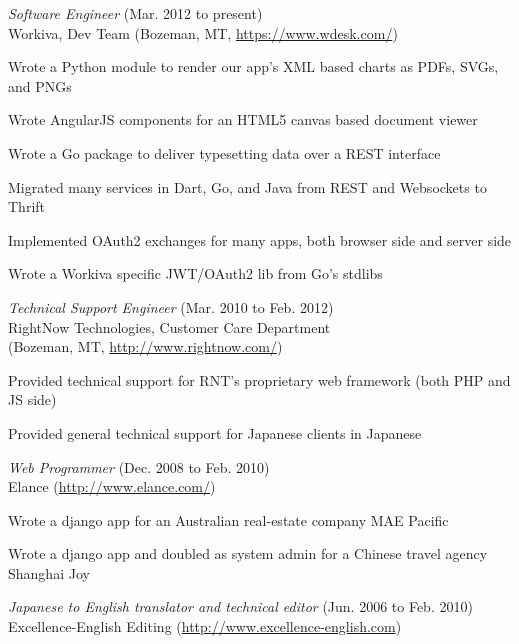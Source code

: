 \documentclass[10pt, a4paper]{article}
\begin{document}
\begin{itemize*}
  \item \emph{Software Engineer} (Mar. 2012 to present)\\
    Workiva, Dev Team (Bozeman, MT, \url{https://www.wdesk.com/})
    \begin{itemize*}
      \item Wrote a Python module to render our app's XML based charts as PDFs, SVGs, and PNGs
      \item Wrote AngularJS components for an HTML5 canvas based document viewer
      \item Wrote a Go package to deliver typesetting data over a REST interface
      \item Migrated many services in Dart, Go, and Java from REST and Websockets to Thrift
      \item Implemented OAuth2 exchanges for many apps, both browser side and server side
      \item Wrote a Workiva specific JWT/OAuth2 lib from Go's stdlibs
    \end{itemize*}
  \item \emph{Technical Support Engineer} (Mar. 2010 to Feb. 2012)\\
    RightNow Technologies, Customer Care Department\\
    (Bozeman, MT, \url{http://www.rightnow.com/})
    \begin{itemize*}
      \item Provided technical support for RNT's proprietary web framework (both PHP and JS side)
      \item Provided general technical support for Japanese clients in Japanese
    \end{itemize*}
  \item \emph{Web Programmer} (Dec. 2008 to Feb. 2010)\\
    Elance (\url{http://www.elance.com/})
    \begin{itemize*}
      \item Wrote a django app for an Australian real-estate company MAE Pacific
      \item Wrote a django app and doubled as system admin for a Chinese travel agency Shanghai Joy
    \end{itemize*}
  \item \emph{Japanese to English translator and technical editor} (Jun. 2006 to Feb. 2010)\\
    Excellence-English Editing (\url{http://www.excellence-english.com})
\end{itemize*}
\end{document}
